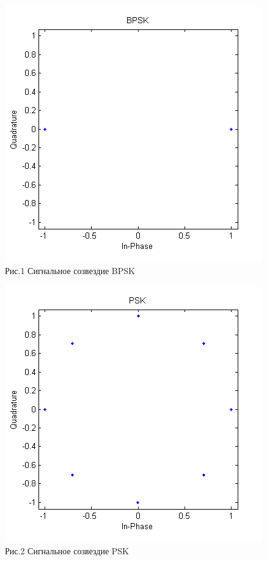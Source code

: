 \documentclass[a4paper]{article}
\begin{document}
\begin{center}
	\includegraphics[scale = 1]{bpsk.png} \\Рис.1 Сигнальное созвездие BPSK
\end{center}
\begin{center}
	\includegraphics[scale = 1]{psk.png} \\Рис.2 Сигнальное созвездие PSK 
\end{center}
\end{document}
